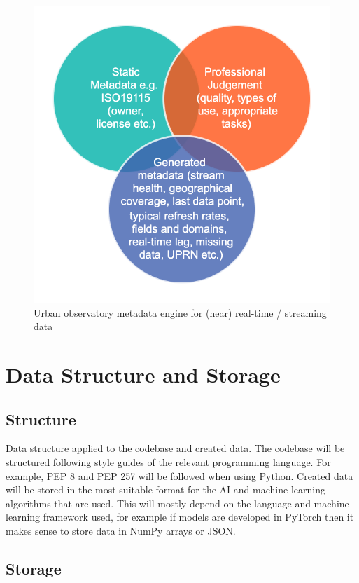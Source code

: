 \documentclass[a4paper, 11pt]{article}
\begin{document}
\begin{figure}[ht]
    \centering
    \includegraphics[scale=0.4]{figures/metadata.png}
    \caption{Urban observatory metadata engine for (near) real-time / streaming data}
    \label{fig:metadata}
\end{figure}

\section{Data Structure and Storage}

\subsection{Structure}

Data structure applied to the codebase and created data. The codebase will be structured following style guides of the relevant programming language. For example, PEP 8 and PEP 257 will be followed when using Python. Created data will be stored in the most suitable format for the AI and machine learning algorithms that are used. This will mostly depend on the language and machine learning framework used, for example if models are developed in PyTorch then it makes sense to store data in NumPy arrays or JSON.

\subsection{Storage}
\end{document}
